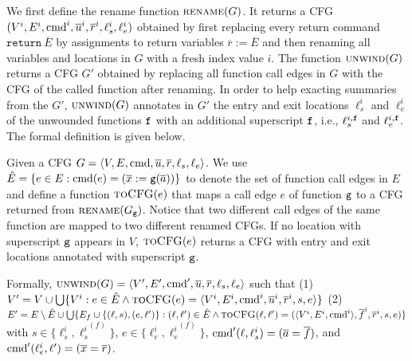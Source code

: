 We first define the rename function $\textsc{rename}(G)$. It returns a CFG $(V^i, E^i,\textmd{cmd}^i, \overline{u}^i, \overline{r}^i,\ell_s^i,\ell_e^i)$ obtained by first replacing every return command $\mathtt{return}\ \overline{E}$ by assignments to return variables $\overline{r} := \overline{E}$ and then renaming all variables and locations in $G$ with a fresh index value $i$. The function $\textsc{unwind}(G)$ returns a CFG $G'$ obtained by replacing all function call edges in $G$ with the CFG of the called function after renaming. In order to help exacting summaries from the $G'$, $\textsc{unwind}(G)$ annotates in $G'$ the entry and exit locations ${\ell_s^i}$ and ${\ell_e^i}$ of the unwounded functions $\mathtt{{f}}$ with an additional superscript $\mathtt{{f}}$, i.e., $\ell_s^{i,\mathtt{{f}}}$ and $\ell_e^{i,\mathtt{{f}}}$. The formal definition is given below.

Given a CFG $G=\langle
V, E,\textmd{cmd}, \overline{u}, \overline{r},{\ell_s},{\ell_e} \rangle$.
We use $\hat{E} =\{e\in E: \textmd{cmd} (e)= (\overline{x}:=\mathtt{g}(\overline{a}))\}$ to denote the set of function call edges in $E$ and define a function $\textsc{toCFG}(e)$ that maps a call edge $e$ of function $\mathtt{{g}}$ to a CFG returned from $\textsc{rename}(G_{\mathtt{{g}}})$. Notice that two different call edges of the same function are mapped to two different renamed CFGs. If no location with superscript $\mathtt{{g}}$ appears in $V$, $\textsc{toCFG}(e)$ returns a CFG with entry and exit locations annotated with superscript $\mathtt{{g}}$.

Formally, $\textsc{unwind}(G) = \langle V', E',\textmd{cmd}', \overline{u}, \overline{r},{\ell_s},{\ell_e} \rangle$ such that (1) $V' = V\cup \bigcup\{V^i: e\in \hat{E} \wedge \textsc{toCFG}(e)= \langle V^i, E^i,\textmd{cmd}^i, \overline{u}^i, \overline{r}^i,s,e\rangle \}$ (2) $E'= E \setminus \hat{E} \cup \bigcup\{E_f\cup\{(\ell, s),(e, \ell')\}: (\ell, \ell')\in \hat{E} \wedge \textsc{toCFG}(\ell, \ell')= (\langle V^i, E^i,\textmd{cmd}^i \rangle, \overline{f}^i, \overline{r}^i,s,e) \}$ with $s\in \{\ell_s^i,{\ell_s^i}^{(f)}\}$, $e\in \{\ell_e^i,{\ell_e^i}^{(f)}\}$, $\textmd{cmd}' (\ell, {\ell_s^i}) = (\overline{a}=\overline{f})$, and $\textmd{cmd}' ({\ell_e^i}, \ell') = (\overline{x}=\overline{r})$.





